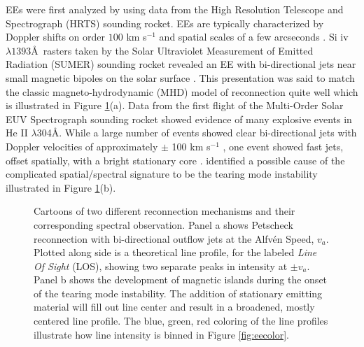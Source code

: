 \documentclass[]{aastex6}
\begin{document}
	
	EEs were first analyzed by \citet{Brueckner1983} using data from the High Resolution Telescope and Spectrograph (HRTS) sounding rocket. EEs are typically characterized by Doppler shifts on order $100$ km s$^{-1}$ and spatial scales of a few arcseconds \citep{Dere1989,Dere1994}.  Si {\sc iv} $\lambda 1393$\AA\ rasters taken by the Solar Ultraviolet Measurement of Emitted Radiation (SUMER) sounding rocket revealed an EE with bi-directional jets near small magnetic bipoles on the solar surface \citep{Innes1997}.  This presentation was said to match the classic magneto-hydrodynamic (MHD) model of reconnection \citep{Petschek1964} quite well which is illustrated in Figure \ref{fig:reconnect}(a). Data from the first flight of the Multi-Order Solar EUV Spectrograph \citep[MOSES;][]{Fox2010} sounding rocket showed evidence of many explosive events in He II $\lambda$304\AA. While a large number of events showed clear bi-directional jets with Doppler velocities of approximately $\pm$ 100 km s$^{-1}$ \citep{Rust2017}, one event showed fast jets, offset spatially, with a bright stationary core \citep{Fox2010}.  \citet{Fox2010} identified a possible cause of the complicated spatial/spectral signature to be the tearing mode instability \citep{Furth1963} illustrated in Figure \ref{fig:reconnect}(b).
	
	\begin{figure}
		
		\centerline{} 
		\caption{Cartoons of two different reconnection mechanisms and their corresponding spectral observation.  Panel a shows Petscheck reconnection with bi-directional outflow jets at the Alfv\'en Speed, $v_a$.  Plotted along side is a theoretical line profile, for the labeled \textit{Line Of Sight} (LOS), showing two separate peaks in intensity at $\pm v_a$. Panel b shows the development of magnetic islands during the onset of the tearing mode instability.  The addition of stationary emitting material will fill out line center and result in a broadened, mostly centered line profile. The blue, green, red coloring of the line profiles illustrate how line intensity is binned in Figure \ref{fig:eecolor}.}
		\label{fig:reconnect}
		
	\end{figure}  
	
\end{document}
